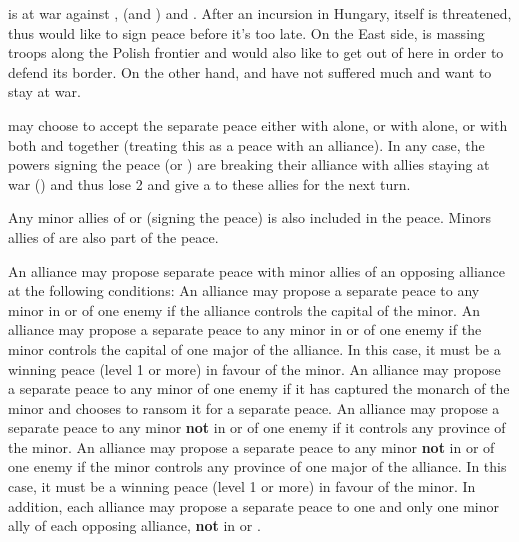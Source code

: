 \begin{exemple}
  \TUR is at war against \VEN, \HIS (and \AUS) and \POL. After an incursion in
  Hungary, \provinceVeneto itself is threatened, thus \VEN would like to sign
  peace before it's too late. On the East side, \RUS is massing troops along
  the Polish frontier and \POL would also like to get out of here in order to
  defend its border. On the other hand, \HIS and \AUS have not suffered much
  and want to stay at war.

  \TUR may choose to accept the separate peace either with \VEN alone, or with
  \POL alone, or with both \VEN and \POL together (treating this as a peace
  with an alliance). In any case, the powers signing the peace (\VEN or \POL)
  are breaking their alliance with allies staying at war (\HIS) and thus lose
  2 \STAB and give a \CB to these allies for the next turn.

  Any minor allies of \VEN or \POL (signing the peace) is also included in the
  peace. Minors allies of \TUR are also part of the peace.
\end{exemple}

\label{chPeace:Separate peace minor}
An alliance may propose separate peace with minor allies of an opposing
alliance at the following conditions:
\bparag An alliance may propose a separate peace to any minor in \VASSAL or
\ANNEXION of one enemy if the alliance controls the capital of the minor.
\bparag An alliance may propose a separate peace to any minor in \VASSAL or
\ANNEXION of one enemy if the minor controls the capital of one major of the
alliance. In this case, it must be a winning peace (level 1 or more) in favour
of the minor.
\bparag An alliance may propose a separate peace to any minor of one enemy if
it has captured the monarch of the minor and chooses to ransom it for a
separate peace.
\bparag An alliance may propose a separate peace to any minor \textbf{not} in
\VASSAL or \ANNEXION of one enemy if it controls any province of the minor.
\bparag An alliance may propose a separate peace to any minor \textbf{not} in
\VASSAL or \ANNEXION of one enemy if the minor controls any province of one
major of the alliance. In this case, it must be a winning peace (level 1 or
more) in favour of the minor.
\bparag In addition, each alliance may propose a separate peace to one and
only one minor ally of each opposing alliance, \textbf{not} in \VASSAL or
\ANNEXION.

